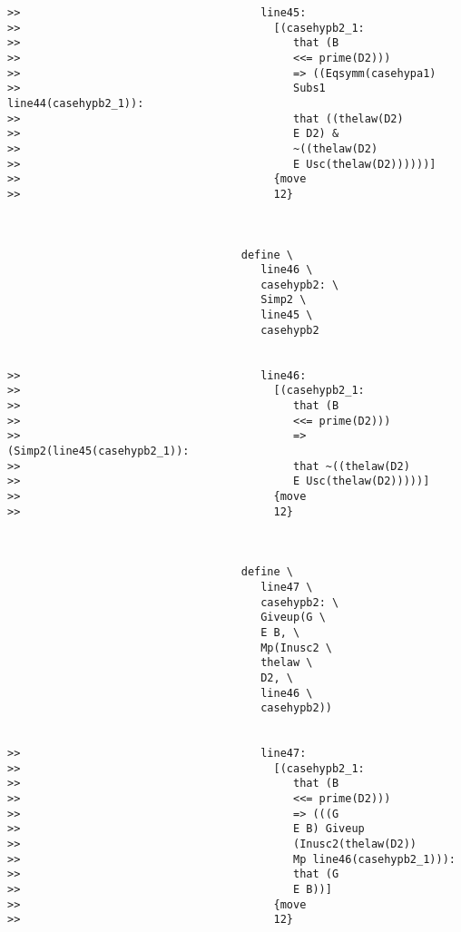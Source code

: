 \documentclass[12pt]{article}
\begin{document}
\begin{verbatim}
>>                                     line45:
>>                                       [(casehypb2_1:
>>                                          that (B
>>                                          <<= prime(D2)))
>>                                          => ((Eqsymm(casehypa1)
>>                                          Subs1 line44(casehypb2_1)):
>>                                          that ((thelaw(D2)
>>                                          E D2) &
>>                                          ~((thelaw(D2)
>>                                          E Usc(thelaw(D2))))))]
>>                                       {move
>>                                       12}



                                    define \
                                       line46 \
                                       casehypb2: \
                                       Simp2 \
                                       line45 \
                                       casehypb2


>>                                     line46:
>>                                       [(casehypb2_1:
>>                                          that (B
>>                                          <<= prime(D2)))
>>                                          => (Simp2(line45(casehypb2_1)):
>>                                          that ~((thelaw(D2)
>>                                          E Usc(thelaw(D2)))))]
>>                                       {move
>>                                       12}



                                    define \
                                       line47 \
                                       casehypb2: \
                                       Giveup(G \
                                       E B, \
                                       Mp(Inusc2 \
                                       thelaw \
                                       D2, \
                                       line46 \
                                       casehypb2))


>>                                     line47:
>>                                       [(casehypb2_1:
>>                                          that (B
>>                                          <<= prime(D2)))
>>                                          => (((G
>>                                          E B) Giveup
>>                                          (Inusc2(thelaw(D2))
>>                                          Mp line46(casehypb2_1))):
>>                                          that (G
>>                                          E B))]
>>                                       {move
>>                                       12}




\end{verbatim}
\end{document}
